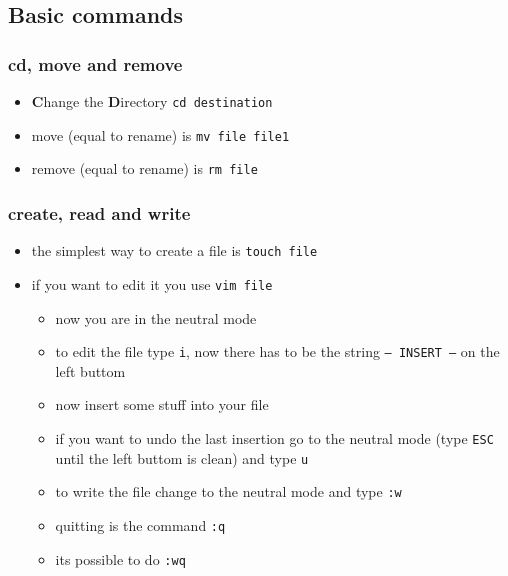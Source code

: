 \documentclass[hyperref={pdfpagelabels=false}]{beamer}
\newcommand{\code}[1]{\colorbox{lGray}{\texttt{#1}}}
\begin{document}
    \subsection{Basic commands}
        \begin{frame}
			\frametitle{cd, move and remove}
			\begin{itemize}
                \item<1-> \textbf{C}hange the \textbf{D}irectory \code{cd destination}
                \item<1-> move (equal to rename) is \code{mv file file1}
                \item<1-> remove (equal to rename) is \code{rm file}
            \end{itemize}
		\end{frame}
        \begin{frame}
			\frametitle{create, read and write}
			\begin{itemize}
                \item<1-> the simplest way to create a file is \code{touch file}
                \item<2-> if you want to edit it you use \code{vim file}
                \begin{itemize}
                    \item<2-> now you are in the neutral mode
                    \item<3-> to edit the file type \code{i}, now there has to be the string \code{-- INSERT --} on the left buttom
                    \item<3-> now insert some stuff into your file
                    \item<4-> if you want to undo the last insertion go to the neutral mode (type \code{ESC} until the left buttom is clean) and type \code{u}
                    \item<5-> to write the file change to the neutral mode and type \code{:w}
                    \item<6-> quitting is the command \code{:q}
                    \item<6-> its possible to do \code{:wq}
                \end{itemize}
            \end{itemize}
		\end{frame}        
\end{document}
